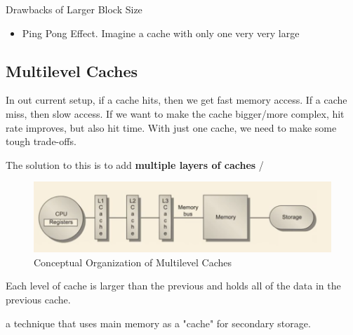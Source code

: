 \documentclass[12pt]{article}
\begin{document}
Drawbacks of Larger Block Size
\begin{itemize}
    \item Ping Pong Effect. Imagine a cache with only one very very large
\end{itemize}

\subsection*{Multilevel Caches}
In out current setup, if a cache hits, then we get fast memory access. If a cache miss, then slow access.
If we want to make the cache bigger/more complex, hit rate improves, but also hit time. With just one cache, we need to make some tough trade-offs.

The solution to this is to add \textbf{multiple layers of caches}
/\begin{figure}[h]
    \centering
    \includegraphics[scale=1.0]{images/multilevelcaches.png}
    \caption{Conceptual Organization of Multilevel Caches}
\end{figure}

Each level of cache is larger than the previous and holds all of the data in the previous cache.

\begin{definition}
    a technique that uses main memory as a "cache" for secondary storage.
\end{definition}
\end{document}
